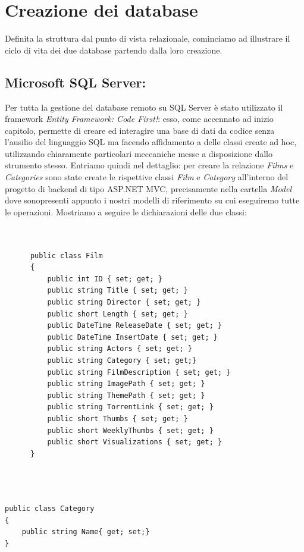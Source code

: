 \documentclass[a4]{book}
\begin{document}
\section{Creazione dei database}

Definita la struttura dal punto di vista relazionale, cominciamo ad illustrare il ciclo di vita dei due database partendo dalla loro creazione.

\subsection{Microsoft SQL Server:}

Per tutta la gestione del database remoto su SQL Server è stato utilizzato il framework \textit{Entity Framework: Code First!}: esso, come accennato ad inizio capitolo, permette di creare ed interagire una base di dati da codice senza l'ausilio del linguaggio SQL ma facendo affidamento a delle classi create ad hoc, utilizzando chiaramente particolari meccaniche messe a disposizione dallo strumento stesso. Entriamo quindi nel dettaglio: per creare la relazione \textit{Films} e \textit{Categories} sono state create le rispettive classi \textit{Film} e \textit{Category} all'interno del progetto di backend di tipo ASP.NET MVC, precisamente nella cartella \textit{Model} dove sonopresenti appunto i nostri modelli di riferimento su cui eseguiremo tutte le operazioni. Mostriamo a seguire le dichiarazioni delle due classi:

\lstset{language=[Sharp]C}
\begin{lstlisting}


	  public class Film
	  {
		  public int ID { set; get; }
		  public string Title { set; get; }
		  public string Director { set; get; }
		  public short Length { set; get; }
		  public DateTime ReleaseDate { set; get; }
		  public DateTime InsertDate { set; get; }
		  public string Actors { set; get; }
		  public string Category { set; get;}
		  public string FilmDescription { set; get; }
		  public string ImagePath { set; get; }
		  public string ThemePath { set; get; }
		  public string TorrentLink { set; get; }
		  public short Thumbs { set; get; }
		  public short WeeklyThumbs { set; get; }
		  public short Visualizations { set; get; }
	  }
	
	
	
\end{lstlisting}

\lstset{language=[Sharp]C}
\begin{lstlisting}
public class Category
{
	public string Name{ get; set;}
}
\end{lstlisting}
\end{document}
